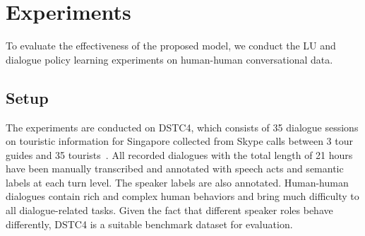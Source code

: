 \documentclass[11pt,letterpaper]{article}
\begin{document}
\section{Experiments}
\label{sec:experiments}

To evaluate the effectiveness of the proposed model, we conduct the LU and dialogue policy learning experiments on human-human conversational data. %




\subsection{Setup}
\label{ssec:settings}
The experiments are conducted on DSTC4, which consists of 35 dialogue sessions on touristic information for Singapore collected from Skype calls between 3 tour guides and 35 tourists~\cite{kim2016fourth}. 
All recorded dialogues with the total length of 21 hours have been manually transcribed and annotated with speech acts and semantic labels at each turn level.
The speaker labels are also annotated.
Human-human dialogues contain rich and complex human behaviors and bring much difficulty to all dialogue-related tasks.
Given the fact that different speaker roles behave differently, DSTC4 is a suitable benchmark dataset for evaluation.
\end{document}
